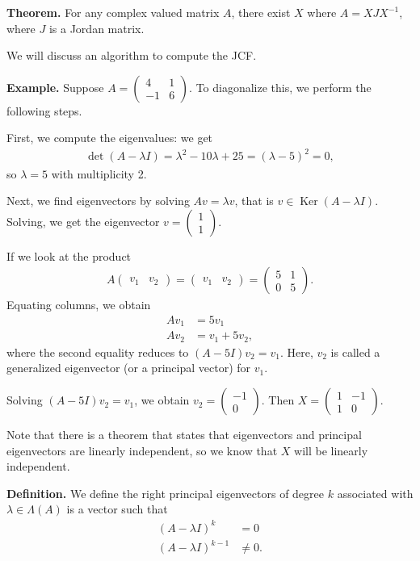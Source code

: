 \documentclass{article}
\newcommand{\mat}[1]{\begin{pmatrix}#1\end{pmatrix}}
\DeclareMathOperator{\Ker}{Ker}
\begin{document}
{\bf Theorem.} For any complex valued matrix $A$, there exist $X$ where $A = X J X^{-1}$, where $J$ is a Jordan matrix.

We will discuss an algorithm to compute the JCF.

{\bf Example.} Suppose $A = \mat{4 & 1 \\ -1 & 6}$.  To diagonalize this, we perform the following steps.

First, we compute the eigenvalues: we get
\begin{align*}
  \det (A - \lambda I) = \lambda^2 - 10 \lambda + 25 = (\lambda - 5)^2 = 0,
\end{align*}
so $\lambda = 5$ with multiplicity 2.

Next, we find eigenvectors by solving $Av = \lambda v$, that is $v \in \Ker (A - \lambda I)$.  Solving, we get the eigenvector $v = \mat{1 \\ 1}$.

If we look at the product
\begin{align*}
  A \mat{v_1 & v_2 }  = \mat{v_1 & v_2} = \mat{5 & 1 \\ 0 & 5}.
\end{align*}
Equating columns, we obtain
\begin{align*}
  A v_1 &= 5 v_1 \\
  A v_2 &= v_1 + 5 v_2,
\end{align*}
where the second equality reduces to $(A - 5I) v_2 = v_1$.  Here, $v_2$ is called a generalized eigenvector (or a principal vector) for $v_1$.

Solving $(A - 5I) v_2 = v_1$, we obtain $v_2 = \mat{-1 \\ 0}$.  Then $X = \mat{1 & -1 \\ 1 & 0}$.

Note that there is a theorem that states that eigenvectors and principal eigenvectors are linearly independent, so we know that $X$ will be linearly independent.

{\bf Definition.} We define the right principal eigenvectors of degree $k$ associated with $\lambda \in \Lambda(A)$ is a vector such that
\begin{align*}
  (A - \lambda I)^k & = 0 \\
  (A - \lambda I)^{k-1} & \neq 0.
\end{align*}
\end{document}
